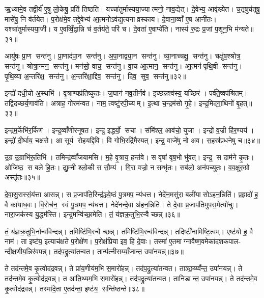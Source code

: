 ऋ॒ध्यामे॒व तद्वी॒र्य॑ ए॒षु लो॒केषु॒ प्रति॑ तिष्ठति। यच्चा॑तुर्मास्यया॒ज्यात्मनो॒ नाव॒द्येत्। दे॒वेभ्य॒ आवृ॑श्च्येत। च॒तृ॒षुच॑तृषु॒ मासे॑षु॒ नि व॑र्तयेत। प॒रोक्ष॑मे॒व तद्दे॒वेभ्य॑ आ॒त्मनोऽव॑द्य॒त्यनाव्रस्काय। दे॒वाना॒व्वाँ ए॒ष आनी॑तः। यश्चा॑तुर्मास्यया॒जी। य ए॒वव्विँ॒द्वान्नि च॑ व॒र्तय॑ते॒ परि॑ च। दे॒वता॑ ए॒वाप्ये॑ति। नास्य॑ रु॒द्रः प्र॒जां प॒शून॒भि म॑न्यते॥३१॥\anuvakamend[ए॒त्ये॒त्य॒यु॒ञ्ज॒तासु॑रा एति लो॒का म॑न्यते]

आयु॑षः प्रा॒ण सन्त॑नु। प्रा॒णाद॑पा॒न सन्त॑नु। अ॒पा॒नाद्व्या॒न सन्त॑नु। व्या॒नाच्चक्षु॒ सन्त॑नु। चक्षु॑ष॒श्श्रोत्र॒ सन्त॑नु। श्रोत्रा॒न्मन॒ सन्त॑नु। मन॑सो॒ वाच॒ सन्त॑नु। वा॒च आ॒त्मान॒ सन्त॑नु। आ॒त्मन॑पृथि॒वी सन्त॑नु। पृ॒थि॒व्या अ॒न्तरि॑क्ष॒ सन्त॑नु। अ॒न्तरि॑क्षा॒द्दिव॒ सन्त॑नु। दिव॒ सुव॒ सन्त॑नु॥३२॥\anuvakamend[अ॒न्तरि॑क्ष॒ सन्त॑नु॒ द्वे च॑]

इन्द्रो॑ दधी॒चो अ॒स्थभि॑। वृ॒त्राण्यप्र॑तिष्कुतः। ज॒घान॑ नव॒तीर्नव॑। इ॒च्छन्नश्व॑स्य॒ यच्छिर॑। पर्व॑ते॒ष्वप॑श्रितम्। तद्वि॑दच्छर्य॒णाव॑ति। अत्राह॒ गोरम॑न्वत। नाम॒ त्वष्टु॑रपी॒च्यम्। इ॒त्था च॒न्द्रम॑सो गृ॒हे। इन्द्र॒मिद्गा॒थिनो॑ बृ॒हत्॥३३॥

इन्द्र॑म॒र्केभि॑र॒र्किण॑। इन्द्र॒व्वाँणी॑रनूषत। इन्द्र॒ इद्धर्यो॒ सचा। संमि॑श्ल॒ आव॑चो॒ युजा। इन्द्रो॑ व॒ज्री हि॑र॒ण्यय॑। इन्द्रो॑ दी॒र्घाय॒ चक्ष॑से। आ सूर्य रोहयद्दि॒वि। वि गोभि॒रद्रि॑मैरयत्। इन्द्र॒ वाजे॑षु नो अव। स॒हस्र॑प्रधनेषु च॥३४॥

उ॒ग्र उ॒ग्राभि॑रू॒तिभि॑। तमिन्द्र॑व्वाँजयामसि। म॒हे वृ॒त्राय॒ हन्त॑वे। स वृषा॑ वृष॒भो भु॑वत्। इन्द्र॒ स दाम॑ने कृ॒तः। ओजि॑ष्ठ॒ स बले॑ हि॒तः। द्यु॒म्नी श्लो॒की स सौ॒म्य॑। गि॒रा वज्रो॒ न सम्भृ॑तः। सब॑लो॒ अन॑पच्युतः। व॒व॒क्षुरु॒ग्रो अस्तृ॑तः॥३५॥\anuvakamend[बृ॒हच्चास्तृ॑तः]

दे॒वा॒सु॒रास्सं॒य॑त्ता आसन्न्। स प्र॒जाप॑ति॒रिन्द्र॑ञ्ज्ये॒ष्ठं पु॒त्रमप॒ न्य॑धत्त। नेदे॑न॒मसु॑रा॒ बली॑यासोऽहन॒न्निति॑। प्र॒ह्रादो॑ ह॒ वै का॑याध॒वः। वि॒रोच॑न॒ स्वं पु॒त्रमप॒ न्य॑धत्त। नेदे॑नन्दे॒वा अ॑हन॒न्निति॑। ते दे॒वाः प्र॒जाप॑तिमुपस॒मेत्यो॑चुः। नारा॒जक॑स्य यु॒द्धम॑स्ति। इन्द्र॒मन्वि॑च्छा॒मेति॑। तं॒ य॑ज्ञक्र॒तुभि॒रन्वैच्छन्न्॥३६॥

तं॒ य॑ज्ञक्र॒तुभि॒र्नान्व॑विन्दन्न्। तमिष्टि॑भि॒रन्वैच्छन्न्। तमिष्टि॑भि॒रन्व॑विन्दन्न्। तदिष्टी॑नामिष्टि॒त्वम्। एष्ट॑यो ह॒ वै नाम॑। ता इष्ट॑य॒ इत्याच॑क्षते प॒रोक्षे॑ण। प॒रोक्ष॑प्रिया इव॒ हि दे॒वाः। तस्मा॑ ए॒तमाग्नावैष्ण॒वमेका॑दशकपाल- न्दीक्ष॒णीय॒न्निर॑वपन्न्। तद॑प॒द्रुत्या॑तन्वत। तान्प॑त्नीसय्याँ॒जान्त॒ उपा॑नयन्न्॥३७॥

ते तद॑न्तमे॒व कृ॒त्वोद॑द्रवन्न्। ते प्रा॑य॒णीय॑म॒भि स॒मारो॑हन्न्। तद॑प॒द्रुत्या॑तन्वत। ताञ्छ॒य्य्वँ॑न्त॒ उपा॑नयन्न्। ते तद॑न्तमे॒व कृ॒त्वोद॑द्रवन्न्। त आ॑ति॒थ्यम॒भि स॒मारो॑हन्न्। तद॑प॒द्रुत्या॑तन्वत। तानिडान्त॒ उपा॑नयन्न्। ते तद॑न्तमे॒व कृ॒त्वोद॑द्रवन्न्। तस्मा॑दे॒ता ए॒तद॑न्ता॒ इष्ट॑य॒ सन्ति॑ष्ठन्ते॥३८॥

